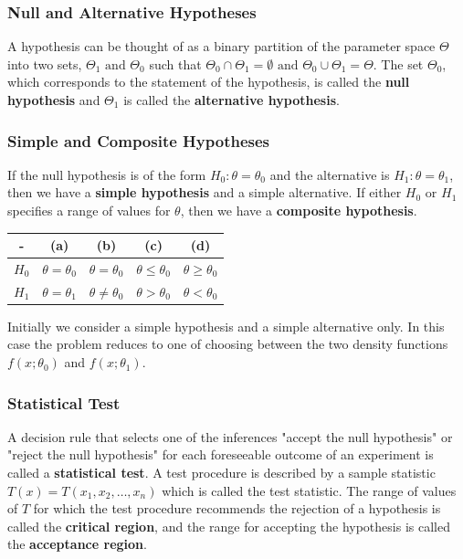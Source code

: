\documentclass{article}
\begin{document}
\subsubsection{Null and Alternative Hypotheses}

A hypothesis can be thought of as a binary partition of the parameter space \(\Theta\) into two sets, \(\Theta_1 \text{ and } \Theta_0\) such that \(\Theta_0 \cap \Theta_1 = \emptyset \text{ and } \Theta_0 \cup \Theta_1 = \Theta\). The set \(\Theta_0\), which corresponds to the statement of the hypothesis, is called the \textbf{null hypothesis} and \(\Theta_1\) is called the \textbf{alternative hypothesis}.

\subsubsection{Simple and Composite Hypotheses}

If the null hypothesis is of the form \(H_0:\theta=\theta_0\) and the alternative is \(H_1:\theta=\theta_1\), then we have a \textbf{simple hypothesis} and a simple alternative. If either \(H_0 \text{ or } H_1\) specifies a range of values for \(\theta\), then we have a \textbf{composite hypothesis}.
\begin{table}[H]
    \centering
    \begin{tabular}{|c|c|c|c|c|}
    \hline
     - & (a) & (b) & (c) & (d)  \\
     \hline
     \(H_0\) & \(\theta=\theta_0\) & \(\theta=\theta_0\) & \(\theta \leq \theta_0\) & \(\theta \geq \theta_0\) \\
     \hline
     \(H_1\) & \(\theta=\theta_1\) & \(\theta \neq \theta_0\) & \(\theta > \theta_0\) & \(\theta < \theta_0\) \\
     \hline
\end{tabular}
    \label{tab:my_label}
\end{table}

Initially we consider a simple hypothesis and a simple alternative only. In this case the problem reduces to one of choosing between the two density functions \(f(x;\theta_0)\) and \(f(x;\theta_1)\).

\subsubsection{Statistical Test}

A decision rule that selects one of the inferences "accept the null hypothesis" or "reject the null hypothesis" for each foreseeable outcome of an experiment is called a \textbf{statistical test}. A test procedure is described by a sample statistic \(T(x)=T(x_1,x_2,\dots,x_n)\) which is called the test statistic. The range of values of \(T\) for which the test procedure recommends the rejection of a hypothesis is called the \textbf{critical region}, and the range for accepting the hypothesis is called the \textbf{acceptance region}.
\end{document}
